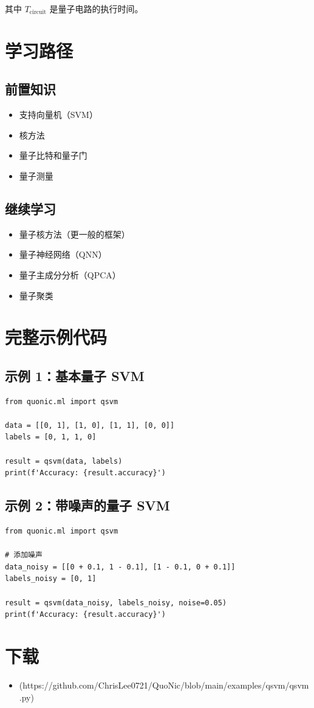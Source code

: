 \documentclass[12pt,a4paper]{article}
\begin{document}
其中 $T_{\text{circuit}}$ 是量子电路的执行时间。

\section{学习路径}

\subsection{前置知识}
\begin{itemize}
  \item 支持向量机（SVM）
  \item 核方法
  \item 量子比特和量子门
  \item 量子测量
\end{itemize}

\subsection{继续学习}
\begin{itemize}
  \item 量子核方法（更一般的框架）
  \item 量子神经网络（QNN）
  \item 量子主成分分析（QPCA）
  \item 量子聚类
\end{itemize}

\section{完整示例代码}

\subsection{示例 1：基本量子 SVM}

\begin{verbatim}
from quonic.ml import qsvm

data = [[0, 1], [1, 0], [1, 1], [0, 0]]
labels = [0, 1, 1, 0]

result = qsvm(data, labels)
print(f'Accuracy: {result.accuracy}')
\end{verbatim}

\subsection{示例 2：带噪声的量子 SVM}

\begin{verbatim}
from quonic.ml import qsvm

# 添加噪声
data_noisy = [[0 + 0.1, 1 - 0.1], [1 - 0.1, 0 + 0.1]]
labels_noisy = [0, 1]

result = qsvm(data_noisy, labels_noisy, noise=0.05)
print(f'Accuracy: {result.accuracy}')
\end{verbatim}

\section{下载}

\begin{itemize}
  \item [qsvm.py](https://github.com/ChrisLee0721/QuoNic/blob/main/examples/qsvm/qsvm.py)
\end{itemize}
\end{document}
